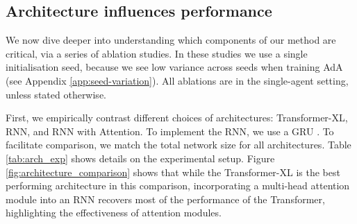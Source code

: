 \subsection{Architecture influences performance} \label{sec:results_architecture}

We now dive deeper into understanding which components of our method are critical, via a series of ablation studies. In these studies we use a single initialisation seed, because we see low variance across seeds when training AdA (see Appendix \ref{app:seed-variation}). All ablations are in the single-agent setting, unless stated otherwise.

First, we empirically contrast different choices of architectures: Transformer-XL, RNN, and RNN with Attention. To implement the RNN, we use a GRU \citep{cho2014properties}. To facilitate comparison, we match the total network size for all architectures. Table \ref{tab:arch_exp} shows details on the experimental setup. Figure \ref{fig:architecture_comparison} shows that while the Transformer-XL is the best performing architecture in this comparison, incorporating a multi-head attention module into an RNN recovers most of the performance of the Transformer, highlighting the effectiveness of attention modules.
